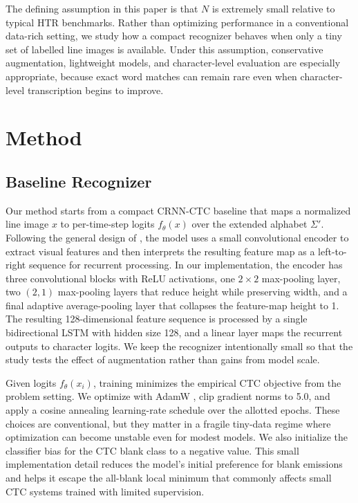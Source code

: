 \documentclass{article} %
\begin{document}
The defining assumption in this paper is that \(N\) is extremely small relative to typical HTR benchmarks. Rather than optimizing performance in a conventional data-rich setting, we study how a compact recognizer behaves when only a tiny set of labelled line images is available. Under this assumption, conservative augmentation, lightweight models, and character-level evaluation are especially appropriate, because exact word matches can remain rare even when character-level transcription begins to improve.

\section{Method}
\label{sec:method}

\subsection{Baseline Recognizer}
Our method starts from a compact CRNN-CTC baseline that maps a normalized line image \(x\) to per-time-step logits \(f_\theta(x)\) over the extended alphabet \(\Sigma'\). Following the general design of \citet{shi2016crnn}, the model uses a small convolutional encoder to extract visual features and then interprets the resulting feature map as a left-to-right sequence for recurrent processing. In our implementation, the encoder has three convolutional blocks with ReLU activations, one \(2 \times 2\) max-pooling layer, two \((2,1)\) max-pooling layers that reduce height while preserving width, and a final adaptive average-pooling layer that collapses the feature-map height to 1. The resulting 128-dimensional feature sequence is processed by a single bidirectional LSTM with hidden size 128, and a linear layer maps the recurrent outputs to character logits. We keep the recognizer intentionally small so that the study tests the effect of augmentation rather than gains from model scale.

Given logits \(f_\theta(x_i)\), training minimizes the empirical CTC objective from the problem setting. We optimize with AdamW \citep{loshchilov2017adamw}, clip gradient norms to 5.0, and apply a cosine annealing learning-rate schedule over the allotted epochs. These choices are conventional, but they matter in a fragile tiny-data regime where optimization can become unstable even for modest models. We also initialize the classifier bias for the CTC blank class to a negative value. This small implementation detail reduces the model's initial preference for blank emissions and helps it escape the all-blank local minimum that commonly affects small CTC systems trained with limited supervision.
\end{document}
